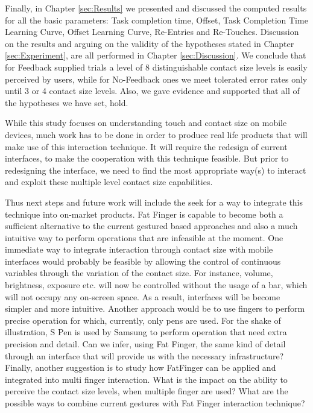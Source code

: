 Finally, in Chapter \ref{sec:Results} we presented and discussed the computed results for all the basic parameters: Task completion time, Offset, Task Completion Time Learning Curve, Offset Learning Curve, Re-Entries and Re-Touches. Discussion on the results and arguing on the validity of the hypotheses stated in Chapter \ref{sec:Experiment}, are all performed in Chapter \ref{sec:Discussion}. We conclude that for Feedback supplied trials a level of 8 distinguishable contact size levels is easily perceived by users, while for No-Feedback ones we meet tolerated error rates only until 3 or 4 contact size levels. Also, we gave evidence and supported that all of the hypotheses we have set, hold.

While this study focuses on understanding touch and contact size on mobile devices, much work has to be done in order to produce real life products that will make use of this interaction technique. It will require the redesign of current interfaces, to make the cooperation with this technique feasible. But prior to redesigning the interface, we need to find the most appropriate way(s) to interact and exploit these multiple level contact size capabilities.

Thus next steps and future work will include the seek for a way to integrate this technique into on-market products. Fat Finger is capable to become both a sufficient alternative to the current gestured based approaches and also a much intuitive way to perform operations that are infeasible at the moment. 
One immediate way to integrate interaction through contact size with mobile interfaces would probably be feasible by allowing the control of continuous variables through the variation of the contact size. For instance, volume, brightness, exposure etc. will now be controlled without the usage of a bar, which will not occupy any on-screen space. As a result, interfaces will be become simpler and more intuitive.
Another approach would be to use fingers to perform precise operation for which, currently, only pens are used. For the shake of illustration, S Pen is used by Samsung to perform operation that need extra precision and detail. Can we infer, using Fat Finger, the same kind of detail through an interface that will provide us with the necessary infrastructure?
Finally, another suggestion is to study how FatFinger can be applied and integrated into multi finger interaction. What is the impact on the ability to perceive the contact size levels, when multiple finger are used? What are the possible ways to combine current gestures with Fat Finger interaction technique? 


